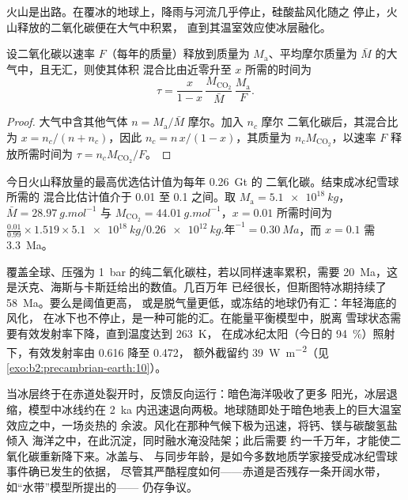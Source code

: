 火山是出路。在覆冰的地球上，降雨与河流几乎停止，硅酸盐风化随之
停止，火山释放的二氧化碳便在大气中积累，
直到其温室效应使冰层融化。

\begin{proposition}[二氧化碳的积累]\label{prop:b2:precambrian-earth:co2}
设二氧化碳以速率 $F$（每年的质量）释放到质量为
$M_{\text{a}}$、平均摩尔质量为 $\bar M$ 的大气中，且无汇，则使其体积
混合比由近零升至 $x$ 所需的时间为
\[
  \tau = \frac{x}{1 - x}\,\frac{M_{\mathrm{CO_2}}}{\bar M}\,\frac{M_{\text{a}}}{F} .
\]
\end{proposition}

\begin{proof}
大气中含其他气体 $n = M_{\text{a}}/\bar M$ 摩尔。加入 $n_c$ 摩尔
二氧化碳后，其混合比为 $x = n_c/(n + n_c)$，因此 $n_c = n\,x/(1 - x)$，其质量为
$n_c M_{\mathrm{CO_2}}$，以速率 $F$ 释放所需时间为 $\tau = n_c M_{\mathrm{CO_2}}/F$。
\end{proof}

\begin{example}[脱离雪球状态需要多久？]\label{ex:b2:precambrian-earth:escape}
今日火山释放量的最高优选估计值为每年 \qty{0.26}{Gt} 的
二氧化碳。结束成冰纪雪球所需的
混合比估计值介于 0.01 至 0.1 之间。取 $M_{\text{a}} =
\qty{5.1e18}{kg}$，$\bar M = \qty{28.97}{g.mol^{-1}}$ 与 $M_{\mathrm{CO_2}} =
\qty{44.01}{g.mol^{-1}}$，$x = 0.01$ 所需时间为 $\frac{0.01}{0.99}\times1.519\times\qty{5.1e18}{kg}
/ \qty{0.26e12}{kg.\text{年}^{-1}} = \qty{0.30}{Ma}$，而 $x = 0.1$ 需 \qty{3.3}{Ma}。
\end{example}

覆盖全球、压强为 \qty{1}{bar} 的纯二氧化碳柱，若以同样速率累积，需要
\qty{20}{Ma}，这是沃克、海斯与卡斯廷给出的数值。几百万年
已经很长，但斯图特冰期持续了 \qty{58}{Ma}。要么是阈值更高，
或是脱气量更低，或冻结的地球仍有汇：年轻海底的风化，
在冰下也不停止，是一种可能的汇。在能量平衡模型中，脱离
雪球状态需要有效发射率下降，直到温度达到 \qty{263}{K}，
在成冰纪太阳（今日的 \qty{94}{\percent}）照射下，有效发射率由 0.616 降至 0.472，
额外截留约 \qty{39}{W.m^{-2}}（见\cref{exo:b2:precambrian-earth:10}）。

当冰层终于在赤道处裂开时，反馈反向运行：暗色海洋吸收了更多
阳光，冰层退缩，模型中冰线约在
\qty{2}{ka} 内迅速退向两极。地球随即处于暗色地表上的巨大温室效应之中，一场炎热的
余波。风化在那种气候下极为迅速，将钙、镁与碳酸氢盐倾入
海洋之中，在此沉淀，同时融水淹没陆架；此后需要
约一千万年，才能使二氧化碳重新降下来。冰盖与、
与同步年龄，是如今多数地质学家接受成冰纪雪球事件确已发生的依据，
尽管其严酷程度如何——赤道是否残存一条开阔水带，如“水带”模型所提出的——
仍存争议。

